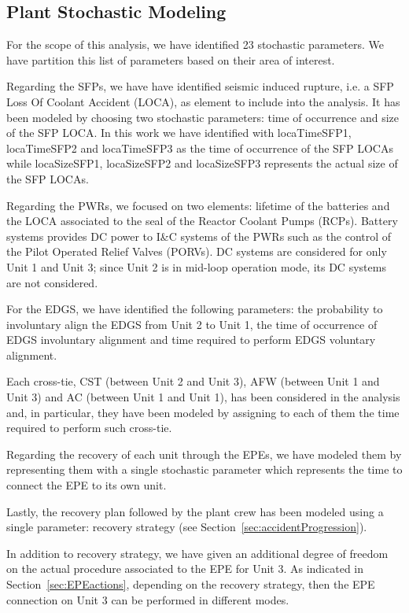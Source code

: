 \subsection{Plant Stochastic Modeling}
\label{sec:plantStochasticModeling}
For the scope of this analysis, we have identified 23 stochastic parameters. We have 
partition this list of parameters based on their area of interest.

Regarding the SFPs, we have have identified seismic induced rupture, i.e. a SFP Loss Of
Coolant Accident (LOCA), as 
element to include into the analysis. It has been modeled by choosing two stochastic 
parameters: time of  occurrence and size of the SFP LOCA. In this work we have identified 
with locaTimeSFP1, locaTimeSFP2 and locaTimeSFP3 as the time of occurrence of the SFP 
LOCAs while locaSizeSFP1, locaSizeSFP2 and locaSizeSFP3 represents the actual size of 
the SFP LOCAs.

Regarding the PWRs, we focused on two elements: lifetime of the batteries and the LOCA 
associated to the seal of the Reactor Coolant Pumps (RCPs). Battery systems provides 
DC power to I\&C systems 
of the PWRs such as the control of the Pilot Operated Relief Valves (PORVs).
DC systems are considered for only 
Unit 1 and Unit 3; since Unit 2 is in mid-loop operation mode, its DC systems are not 
considered.

For the EDGS, we have identified the following parameters: the probability to 
involuntary align the EDGS from Unit 2 to Unit 1, the time of occurrence of EDGS
involuntary alignment and time required to perform EDGS voluntary alignment.  

Each cross-tie, CST (between Unit 2 and Unit 3), AFW (between Unit 1 and Unit 3) 
and AC (between Unit 1 and Unit 1), has been considered in the analysis and, in 
particular, they have been modeled by assigning to each of them the time required 
to perform such cross-tie.

Regarding the recovery of each unit through the EPEs, we have modeled them by 
representing them with a single stochastic parameter which represents the
time to connect the EPE to its own unit.

Lastly, the recovery plan followed by the plant crew has been modeled using a single
parameter: recovery strategy (see Section~\ref{sec:accidentProgression}).

In addition to recovery strategy, we have given an additional degree of freedom on 
the actual procedure associated to the EPE for Unit 3. 
As indicated in Section~\ref{sec:EPEactions}, depending on the  recovery strategy, 
then the EPE connection on Unit 3 can be performed in different modes. 

